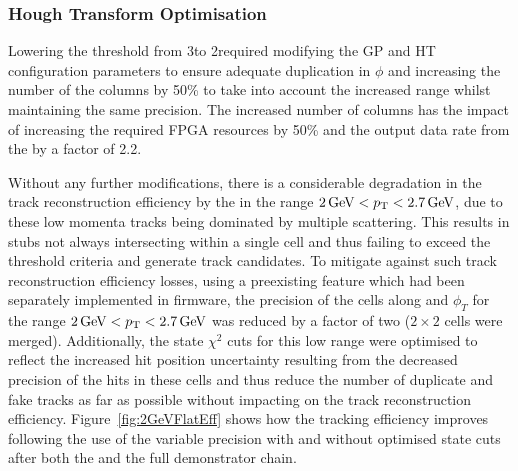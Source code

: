 \subsubsection{Hough Transform Optimisation}\label{subsubsec:lowPtOptHT}
Lowering the \HT \pT threshold from 3\GeVc to 2\GeVc required modifying the GP and HT configuration parameters to ensure adequate duplication in $\phi$ and increasing the number of the \qpt columns by 50\% to take into account the increased \pt range whilst maintaining the same precision.
The increased number of \qpt columns has the impact of increasing the required FPGA resources by 50\% and the output data rate from the \HT by a factor of 2.2.

Without any further modifications, there is a considerable degradation in the track reconstruction efficiency by the \HT in the range $2\,\text{Ge\hspace{-.08em}V} < p_{\mathrm{T}} < 2.7\,\text{Ge\hspace{-.08em}V}$, due to these low momenta tracks being dominated by multiple scattering.
This results in stubs not always intersecting within a single \HT cell and thus failing to exceed the threshold criteria and generate track candidates.
To mitigate against such track reconstruction efficiency losses, using a preexisting feature which had been separately implemented in firmware, the precision of the \HT cells along \qpt and $\phi_{T}$ for the range $2\,\text{Ge\hspace{-.08em}V} < p_{\mathrm{T}} < 2.7\,\text{Ge\hspace{-.08em}V}$ was reduced by a factor of two (\ie $2 \times 2$ cells were merged).
Additionally, the \KF state $\chi^2$ cuts for this low \pT range were optimised to reflect the increased hit position uncertainty resulting from the decreased precision of the hits in these \HT cells and thus reduce the number of duplicate and fake tracks as far as possible without impacting on the \HT track reconstruction efficiency.
Figure~\ref{fig:2GeVFlatEff} shows how the tracking efficiency improves following the use of the variable precision \HT with and without optimised \KF state cuts after both the \HT and the full demonstrator chain. 

